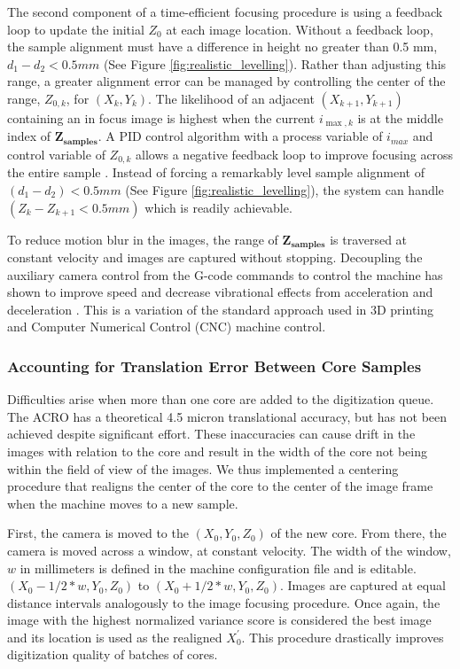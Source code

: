 \documentclass[a4paper,12pt]{article}
\begin{document}
The second component of a time-efficient focusing procedure is using a feedback loop to update the initial $Z_0$ at each image location. 
Without a feedback loop, the sample alignment must have a difference in height no greater than 0.5 mm, $d_1 - d_2 < 0.5 mm $ (See Figure \ref{fig:realistic_levelling}). 
Rather than adjusting this range, a greater alignment error can be managed by controlling the center of the range, $Z_{0,k}$, for $(X_k,Y_k)$. 
The likelihood of an adjacent $(X_{k+1}, Y_{k+1})$ containing an in focus image is highest when the current $i_{{\max,k}}$ is at the middle index of $\boldsymbol{Z_{samples}}$. 
A PID control algorithm with a process variable of $i_{max}$ and control variable of $Z_{0,k}$ allows a negative feedback loop to improve focusing across the entire sample \citep{odwyer_summary_2000}. 
Instead of forcing a remarkably level sample alignment of $(d_1 - d_2) < 0.5mm$ (See Figure \ref{fig:realistic_levelling}), the system can handle $(Z_{k} - Z_{k+1} < 0.5mm)$ which is readily achievable. %

To reduce motion blur in the images, the range of $\boldsymbol{Z_{\text{samples}}}$ is traversed at constant velocity and images are captured without stopping. 
Decoupling the auxiliary camera control from the G-code commands to control the machine has shown to improve speed and decrease vibrational effects from acceleration and deceleration \citep{propst_time_2025}.
This is a variation of the standard approach used in 3D printing and Computer Numerical Control (CNC) machine control. 
  
\subsubsection{Accounting for Translation Error Between Core Samples}

Difficulties arise when more than one core are added to the digitization queue.
The ACRO has a theoretical 4.5 micron translational accuracy, but has not been achieved despite significant effort.
These inaccuracies can cause drift in the images with relation to the core and result in the width of the core not being within the field of view of the images.
We thus implemented a centering procedure that realigns the center of the core to the center of the image frame when the machine moves 
to a new sample. 

First, the camera is moved to the $(X_0, Y_0, Z_0)$ of the new core. 
From there, the camera is moved across a window, at constant velocity. The width of the window, $w$ in millimeters is defined in the machine configuration file and is editable. $(X_0 - 1/2*{w}, Y_0, Z_0)$ to $(X_0 + 1/2*{w}, Y_0, Z_0)$. 
Images are captured at equal distance intervals analogously to the image focusing procedure. 
Once again, the image with the highest normalized variance score is considered the best image and its location is used as the realigned $X_0^\prime$.
This procedure drastically improves digitization quality of batches of cores.
\end{document}
